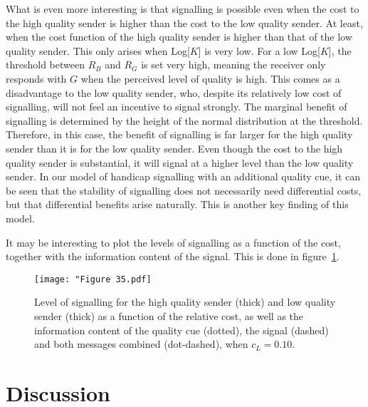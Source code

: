 \documentclass[a4paper,12pt]{article}
\numberwithin{equation}{section}
\begin{document}
What is even more interesting is that signalling is possible even when the cost to the high quality sender is higher than the cost to the low quality sender. At least, when the cost function of the high quality sender is higher than that of the low quality sender. This only arises when Log[$K$] is very low. For a low Log[$K$], the threshold between $R_{B}$ and $R_{G}$ is set very high, meaning the receiver only responds with $G$ when the perceived level of quality is high. This comes as a disadvantage to the low quality sender, who, despite its relatively low cost of signalling, will not feel an incentive to signal strongly. The marginal benefit of signalling is determined by the height of the normal distribution at the threshold. Therefore, in this case, the benefit of signalling is far larger for the high quality sender than it is for the low quality sender. Even though the cost to the high quality sender is substantial, it will signal at a higher level than the low quality sender. In our model of handicap signalling with an additional quality cue, it can be seen that the stability of signalling does not necessarily need differential costs, but that differential benefits arise naturally. This is another key finding of this model.

\newpage

It may be interesting to plot the levels of signalling as a function of the cost, together with the information content of the signal. This is done in figure~\ref{fig:Figure 35.pdf}.
\begin{figure}[h]
\captionsetup{width=300pt}
\begin{center}
\leavevmode
\texttt{[image: "Figure 35.pdf]}
\caption{Level of signalling for the high quality sender (thick) and low quality sender (thick) as a function of the relative cost, as well as the information content of the quality cue (dotted), the signal (dashed) and both messages combined (dot-dashed), when $c_{L}=0.10$.}
\label{fig:Figure 35.pdf}
\end{center}
\end{figure}

\newpage


\section{Discussion}
\label{sec:Discussion}
\end{document}
